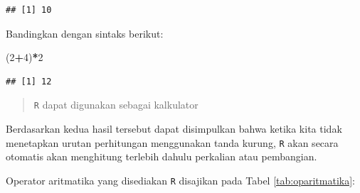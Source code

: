 \documentclass[]{book}
\newenvironment{Shaded}{\begin{snugshade}}{\end{snugshade}}
\newcommand{\DecValTok}[1]{\textcolor[rgb]{0.00,0.00,0.81}{#1}}
\newcommand{\OperatorTok}[1]{\textcolor[rgb]{0.81,0.36,0.00}{\textbf{#1}}}
\newcommand{\NormalTok}[1]{#1}
\begin{document}
\begin{verbatim}
## [1] 10
\end{verbatim}

Bandingkan dengan sintaks berikut:

\begin{Shaded}
\begin{Highlighting}[]
\NormalTok{(}\DecValTok{2}\OperatorTok{+}\DecValTok{4}\NormalTok{)}\OperatorTok{*}\DecValTok{2}
\end{Highlighting}
\end{Shaded}

\begin{verbatim}
## [1] 12
\end{verbatim}

\begin{quote}
\texttt{R} dapat digunakan sebagai kalkulator
\end{quote}

Berdasarkan kedua hasil tersebut dapat disimpulkan bahwa ketika kita
tidak menetapkan urutan perhitungan menggunakan tanda kurung, \texttt{R}
akan secara otomatis akan menghitung terlebih dahulu perkalian atau
pembangian.

Operator aritmatika yang disediakan \texttt{R} disajikan pada Tabel
\ref{tab:oparitmatika}:
\end{document}
